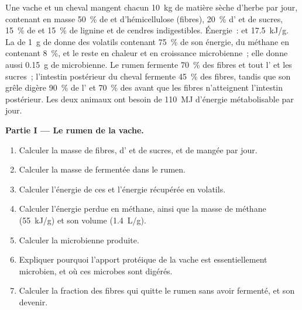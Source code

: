 \begin{problem}
\label{pb:b1:digestion-absorption:1}
Une vache et un cheval mangent chacun \qty{10}{kg} de matière sèche
d'herbe par jour, contenant en masse \qty{50}{\%} de  et
d'hémicellulose (fibres), \qty{20}{\%} d' et de sucres,
\qty{15}{\%} de  et \qty{15}{\%} de lignine et de cendres
indigestibles. Énergie~:  et  \qty{17.5}{kJ/g}. La
 de \qty{1}{g} de  donne des  volatils
contenant \qty{75}{\%} de son énergie, du méthane en contenant
\qty{8}{\%}, et le reste en chaleur et en croissance microbienne~; elle
donne aussi \qty{0.15}{g} de  microbienne. Le rumen fermente
\qty{70}{\%} des fibres et tout l' et les sucres~; l'intestin
postérieur du cheval fermente \qty{45}{\%} des fibres, tandis que son
grêle digère \qty{90}{\%} de l' et \qty{70}{\%} des 
avant que les fibres n'atteignent l'intestin postérieur. Les deux
animaux ont besoin de \qty{110}{MJ} d'énergie métabolisable par jour.

\medskip
\noindent\textbf{Partie I --- Le rumen de la vache.}
\begin{enumerate}
  \item Calculer la masse de fibres, d' et de sucres, et de
         mangée par jour.
  \item Calculer la masse de  fermentée dans le rumen.
  \item Calculer l'énergie de ces  et l'énergie récupérée en
         volatils.
  \item Calculer l'énergie perdue en méthane, ainsi que la masse de
        méthane (\qty{55}{kJ/g}) et son volume (\qty{1.4}{L/g}).
  \item Calculer la  microbienne produite.
  \item Expliquer pourquoi l'apport protéique de la vache est
        essentiellement microbien, et où ces microbes sont digérés.
  \item Calculer la fraction des fibres qui quitte le rumen sans avoir
        fermenté, et son devenir.
\end{enumerate}


\end{problem}

